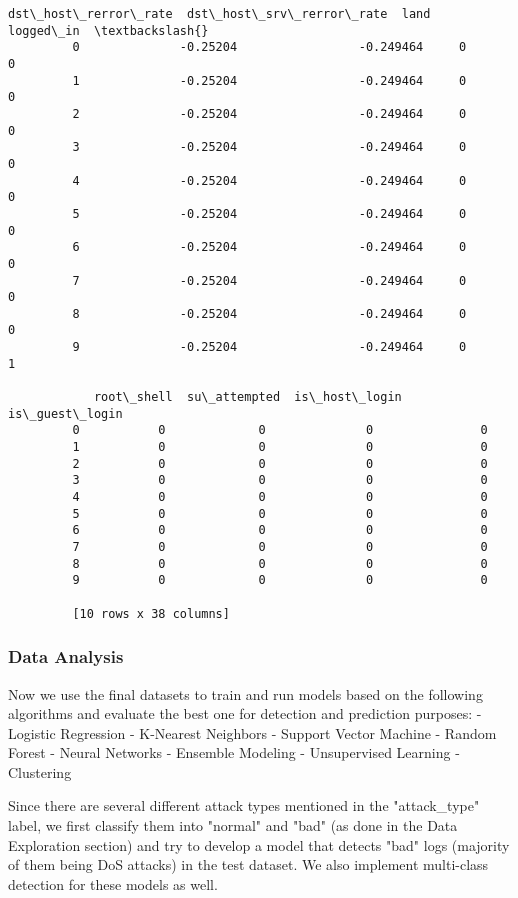 \documentclass[11pt]{article}
\begin{document}
\begin{Verbatim}[commandchars=\\\{\}]
            dst\_host\_rerror\_rate  dst\_host\_srv\_rerror\_rate  land  logged\_in  \textbackslash{}
         0              -0.25204                 -0.249464     0          0   
         1              -0.25204                 -0.249464     0          0   
         2              -0.25204                 -0.249464     0          0   
         3              -0.25204                 -0.249464     0          0   
         4              -0.25204                 -0.249464     0          0   
         5              -0.25204                 -0.249464     0          0   
         6              -0.25204                 -0.249464     0          0   
         7              -0.25204                 -0.249464     0          0   
         8              -0.25204                 -0.249464     0          0   
         9              -0.25204                 -0.249464     0          1   
         
            root\_shell  su\_attempted  is\_host\_login  is\_guest\_login  
         0           0             0              0               0  
         1           0             0              0               0  
         2           0             0              0               0  
         3           0             0              0               0  
         4           0             0              0               0  
         5           0             0              0               0  
         6           0             0              0               0  
         7           0             0              0               0  
         8           0             0              0               0  
         9           0             0              0               0  
         
         [10 rows x 38 columns]
\end{Verbatim}
            
    \subsubsection{Data Analysis}\label{data-analysis}

Now we use the final datasets to train and run models based on the
following algorithms and evaluate the best one for detection and
prediction purposes: - Logistic Regression - K-Nearest Neighbors -
Support Vector Machine - Random Forest - Neural Networks - Ensemble
Modeling - Unsupervised Learning - Clustering

Since there are several different attack types mentioned in the
"attack\_type" label, we first classify them into "normal" and "bad" (as
done in the Data Exploration section) and try to develop a model that
detects "bad" logs (majority of them being DoS attacks) in the test
dataset. We also implement multi-class detection for these models as
well.
\end{document}
